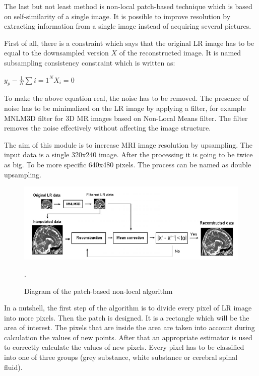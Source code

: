 The last but not least method is non-local patch-based technique which is based on self-similarity of a single image. It is possible to improve resolution by extracting information from a single image instead of acquiring several pictures.

First of all, there is a constraint which says that the original LR image has to be equal to the downsampled version $X$ of the reconstructed image. It is named subsampling consistency constraint which is written as:
\newline \centerline{$y_{p}-\frac{1}{N}\sum{i=1}^{N}X_{i}=0$}
\newline
\newline To make the above equation real, the noise has to be removed. The presence of noise has to be minimalized on the LR image by applying a filter, for example MNLM3D filter for 3D MR images based on Non-Local Means filter. The filter removes the noise effectively without affecting the image structure. 


The aim of this module is to increase MRI image resolution by upsampling.
The input data is a single 320x240 image. After the processing it
is going to be twice as big. To be more specific 640x480 pixels. The
process can be named as double upsampling.

\begin{figure}[H]
\centering{}\includegraphics[scale=0.7]{figures/Module_10/Module10_1}\caption{Diagram of the patch-based non-local algorithm \cite{9art1}}. 
\label{fig: Module9_1}
\end{figure}

In a nutshell, the first step of the algorithm is to divide every pixel of LR image into more pixels. Then the patch is designed. It is a rectangle which will be the area of interest. The pixels that are inside the area are taken into account during calculation the values of new points.
After that an appropriate estimator is used to correctly calculate the values of new pixels. Every pixel has to be classified into one of three groups (grey substance, white substance or cerebral spinal fluid).


